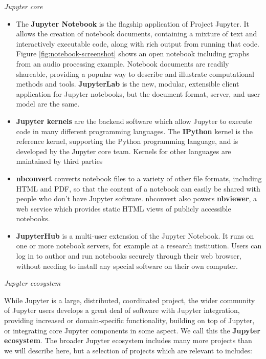 \medskip\noindent\emph{Jupyter core}
\begin{itemize}
  \item The \textbf{Jupyter Notebook} is the flagship application of Project Jupyter.
  It allows the creation of notebook documents, containing a mixture of text and
  interactively executable code, along with rich output from running that code.
  Figure \ref{fig:notebook-screenshot} shows an open notebook including graphs
  from an audio processing example. Notebook documents are readily shareable,
  providing a popular way to describe and illustrate computational methods and
  tools.
  \textbf{JupyterLab} is the new, modular, extensible client application
  for Jupyter notebooks, but the document format, server, and user model are the same.

  \item \textbf{Jupyter kernels} are the backend software which allow Jupyter to execute
  code in many different programming languages. The \textbf{IPython} kernel is
  the reference kernel, supporting the Python programming language, and is
  developed by the Jupyter core team. Kernels for other languages are maintained
  by third parties

  \item \textbf{nbconvert} converts notebook files to a variety of other file
  formats, including HTML and PDF, so that the content of a notebook can easily
  be shared with people who don't have Jupyter software. nbconvert also powers
  \textbf{nbviewer}, a web service which provides static HTML views of publicly
  accessible notebooks.

  \item \textbf{JupyterHub} is a multi-user extension of the Jupyter Notebook.
  It runs on one or more notebook servers, for example at a research institution.
  Users can log in to author and run notebooks securely through their web
  browser, without needing to install any special software on their own
  computer.

\end{itemize}

\medskip\noindent\emph{Jupyter ecosystem}\label{jupyter-ecosystem}

While Jupyter is a large, distributed, coordinated project,
the wider community of Jupyter users develops a great deal of
software with Jupyter integration,
providing increased or domain-specific functionality,
building on top of Jupyter, or integrating core Jupyter components in some aspect.
We call this the \textbf{Jupyter ecosystem}.
The broader Jupyter ecosystem includes many more projects than we will describe
here, but a selection of projects which are relevant to
\TheProject includes:

